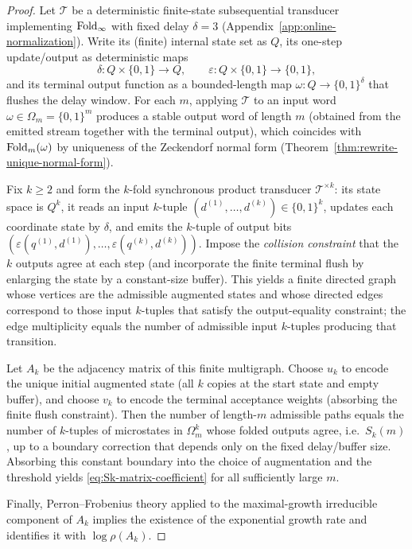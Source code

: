 \begin{proof}
Let $\mathcal{T}$ be a deterministic finite-state subsequential transducer implementing $\mathrm{Fold}_\infty$ with fixed delay $\delta=3$ (Appendix~\ref{app:online-normalization}).
Write its (finite) internal state set as $Q$, its one-step update/output as deterministic maps
\[
\delta:Q\times\{0,1\}\to Q,\qquad \varepsilon:Q\times\{0,1\}\to\{0,1\},
\]
and its terminal output function as a bounded-length map $\omega:Q\to\{0,1\}^{\delta}$ that flushes the delay window.
For each $m$, applying $\mathcal{T}$ to an input word $\omega\in\Omega_m=\{0,1\}^m$ produces a stable output word of length $m$ (obtained from the emitted stream together with the terminal output), which coincides with $\mathrm{Fold}_m(\omega)$ by uniqueness of the Zeckendorf normal form (Theorem~\ref{thm:rewrite-unique-normal-form}).
\par
Fix $k\ge 2$ and form the $k$-fold synchronous product transducer $\mathcal{T}^{\times k}$: its state space is $Q^k$, it reads an input $k$-tuple
\(
(d^{(1)},\dots,d^{(k)})\in\{0,1\}^k
\),
updates each coordinate state by $\delta$, and emits the $k$-tuple of output bits
\(
(\varepsilon(q^{(1)},d^{(1)}),\dots,\varepsilon(q^{(k)},d^{(k)})).
\)
Impose the \emph{collision constraint} that the $k$ outputs agree at each step (and incorporate the finite terminal flush by enlarging the state by a constant-size buffer).
This yields a finite directed graph whose vertices are the admissible augmented states and whose directed edges correspond to those input $k$-tuples that satisfy the output-equality constraint; the edge multiplicity equals the number of admissible input $k$-tuples producing that transition.
\par
Let $A_k$ be the adjacency matrix of this finite multigraph.
Choose $u_k$ to encode the unique initial augmented state (all $k$ copies at the start state and empty buffer), and choose $v_k$ to encode the terminal acceptance weights (absorbing the finite flush constraint).
Then the number of length-$m$ admissible paths equals the number of $k$-tuples of microstates in $\Omega_m^k$ whose folded outputs agree, i.e.\ $S_k(m)$, up to a boundary correction that depends only on the fixed delay/buffer size.
Absorbing this constant boundary into the choice of augmentation and the threshold yields \eqref{eq:Sk-matrix-coefficient} for all sufficiently large $m$.
\par
Finally, Perron--Frobenius theory applied to the maximal-growth irreducible component of $A_k$ implies the existence of the exponential growth rate and identifies it with $\log\rho(A_k)$.
\end{proof}

